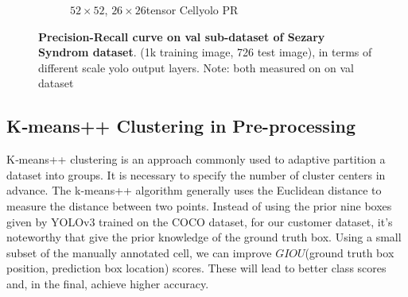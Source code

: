 \begin{figure}[h]
\begin{center}
\begin{subfigure}[b]{0.49\textwidth}
			\caption{$52 \times 52$, $26 \times 26$tensor Cellyolo PR }
			\label{fig:cellnet}
		\end{subfigure}
	\end{center}
	\caption{\textbf{Precision-Recall curve on val sub-dataset of Sezary Syndrom dataset}. (1k training image, 726 test image), in terms of different scale yolo output layers. Note: both measured on on val dataset}
\end{figure}



\subsection{K‐means++ Clustering in Pre-processing}

K‐means++ clustering is an approach commonly used to adaptive partition a dataset into groups. It is necessary to specify the number of cluster centers in advance. The k‐means++ algorithm generally uses the Euclidean distance to measure the distance between two points. Instead of using the prior nine boxes given by YOLOv3 trained on the COCO dataset, for our customer dataset, it's noteworthy that give the prior knowledge of the ground truth box. Using a small subset of the manually annotated cell, we can improve $GIOU$(ground truth box position, prediction box location) scores. These will lead to better class scores and, in the final, achieve higher accuracy.


